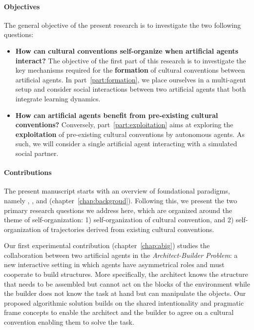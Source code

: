 \paragraph{Objectives}

The general objective of the present research is to investigate the two following questions: 
\begin{itemize}
	\item \textbf{How can cultural conventions self-organize when artificial agents interact?} The objective of the first part of this research is to investigate the key mechanisms required for the \textbf{formation} of cultural conventions between artificial agents. In part~\ref{part:formation}, we place ourselves in a multi-agent setup and consider social interactions between two artificial agents that both integrate learning dynamics. 
	\item \textbf{How can artificial agents benefit from pre-existing cultural conventions?} Conversely, part~\ref{part:exploitation} aims at exploring the \textbf{exploitation} of pre-existing cultural conventions by autonomous agents. As such, we will consider a single artificial agent interacting with a simulated social partner.
\end{itemize}


\paragraph{Contributions}

The present manuscript starts with an overview of foundational \ai paradigms, namely \rl, \il, and \marl (chapter~\ref{chap:backgroud}). Following this, we present the two primary research questions we address here, which are organized around the theme of self-organization: 1) self-organization of cultural convention, and 2) self-organization of trajectories derived from existing cultural conventions.

Our first experimental contribution (chapter~\ref{chap:abig}) studies the collaboration between two artificial agents in the \textit{Architect-Builder Problem}: a new interactive setting in which agents have asymmetrical roles and must cooperate to build structures. More specifically, the architect knows the structure that needs to be assembled but cannot act on the blocks of the environment while the builder does not know the task at hand but can manipulate the objects. Our proposed algorithmic solution builds on the shared intentionality and pragmatic frame concepts to enable the architect and the builder to agree on a cultural convention enabling them to solve the task. 

